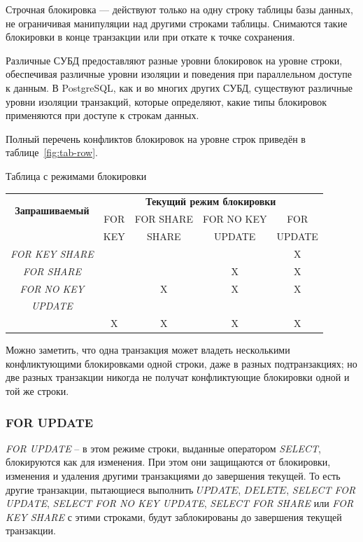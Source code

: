 Строчная блокировка --- действуют только на одну строку таблицы базы данных, не ограничивая манипуляции над другими строками таблицы.
Снимаются такие блокировки в конце транзакции или при откате к точке сохранения.

Различные СУБД предоставляют разные уровни блокировок на уровне строки, обеспечивая различные уровни изоляции и поведения при параллельном доступе к данным. 
В PostgreSQL, как и во многих других СУБД, существуют различные уровни изоляции транзакций, которые определяют, какие типы блокировок применяются при доступе к строкам данных.

Полный перечень конфликтов блокировок на уровне строк приведён в таблице~\ref{fig:tab-row}. 

\begin{threeparttable}
	\caption{Таблица с режимами блокировки}
	\label{fig:tab-row}
	\begin{tabular}{|c|c|c|c|c|}
		\hline
		\multirow{2}{*}{\textbf{Запрашиваемый}} & \multicolumn{4}{c|}{\textbf{Текущий режим блокировки}} \\
		\cline{2-5} 
		\multirow{2}{*}{\textbf{режим блокировки}}
		& FOR & FOR SHARE & FOR NO KEY & FOR \\
		& KEY & SHARE & UPDATE & UPDATE \\
		\hline
		\textit{FOR KEY SHARE} & & & & X \\
		\hline 
		\textit{FOR SHARE} & & & X & X\\
		\hline
		\textit{FOR NO KEY} & & X & X & X\\
		\textit{UPDATE} & & & &\\
		\hline
		\text{FOR UPDATE} & X & X & X & X \\
		\hline 
	\end{tabular}
\end{threeparttable}
\newline

Можно заметить, что одна транзакция может владеть несколькими конфликтующими блокировками одной строки, даже в разных подтранзакциях; но две разных транзакции никогда не получат конфликтующие блокировки одной и той же строки.

\subsubsection*{FOR UPDATE}

\sloppy

\textit{FOR UPDATE} -- в этом режиме строки, выданные оператором \textit{SELECT}, блокируются как для изменения. 
При этом они защищаются от блокировки, изменения и удаления другими транзакциями до завершения текущей.
То есть другие транзакции, пытающиеся выполнить $UPDATE$, $DELETE$, \textit{SELECT FOR UPDATE}, \textit{SELECT FOR NO KEY UPDATE}, \textit{SELECT FOR SHARE} или \textit{FOR KEY SHARE} с этими строками, будут заблокированы до завершения текущей транзакции.


